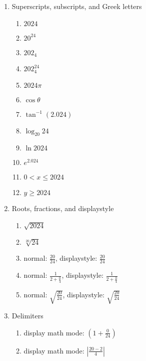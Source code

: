 \documentclass{article}
\begin{document}
\begin{enumerate}
    \item Superscripts, subscripts, and Greek letters
    \begin{enumerate}
        \item \(2024\)
        \item \(20^{24}\)
        \item \(202_4\)
        \item \(202_4^{24}\)
        \item \(2024\pi\)
        \item \(\cos \theta\)
        \item \(\tan^{-1}(2.024)\)
        \item \(\log_{20} 24\)
        \item \(\ln 2024\)
        \item \(e^{2.024}\)
        \item \(0 < x \leq 2024\)
        \item \(y \geq 2024\)
    \end{enumerate}
    
    \item Roots, fractions, and displaystyle
    \begin{enumerate}
        \item \(\sqrt{2024}\)
        \item \(\sqrt[20]{24}\)
        \item normal: \(\frac{20}{24}\), displaystyle: \(\displaystyle \frac{20}{24}\)
        \item normal: \(\frac{1}{2 + \frac{0}{4}}\), displaystyle: \(\displaystyle \frac{1}{2 + \frac{0}{4}}\)
        \item normal: \(\sqrt{\frac{20}{24}}\), displaystyle: \(\displaystyle \sqrt{\frac{20}{24}}\)
    \end{enumerate}
    
    \item Delimiters
    \begin{enumerate}
        \item display math mode: \(\left(1 + \frac{0}{24}\right)\)
        \item display math mode: \(\left|\frac{20 - 2}{4}\right|\)
    \end{enumerate}
\end{enumerate}
\end{document}
